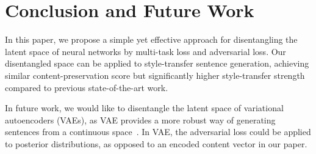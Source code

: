 \documentclass[11pt,a4paper]{article}
\begin{document}
\section{Conclusion and Future Work}
In this paper, we propose a simple yet effective approach for disentangling the latent space of neural networks by multi-task loss and adversarial loss. Our disentangled space can be applied to style-transfer sentence generation, achieving similar content-preservation score but significantly higher style-transfer strength compared to previous state-of-the-art work.

In future work, we would like to disentangle the latent space of variational autoencoders (VAEs), as VAE provides a more robust way of generating sentences from a continuous space~\cite{bowman2016generating}. In VAE, the adversarial loss could be applied to posterior distributions, as opposed to an encoded content vector in our paper.



\end{document}
